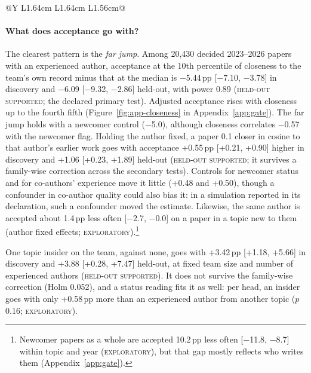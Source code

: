 \documentclass[11pt]{article}
\newcommand{\lab}[1]{\textsc{#1}}
\begin{document}
\begin{table}[t]
\begin{tabularx}{\columnwidth}{@{}Y L{1.64cm} L{1.64cm} L{1.56cm}@{}}
\bottomrule
\end{tabularx}
\caption{The gate: pp within topic and year (topic edges and keywords: against the same year's other papers). Rows
differ in population and unit: compare replication status, not size. Held-out tests are one-sided and confirm
direction, not size. $^a$Registered; predicted a penalty; MDE80 4.8. $^b$Explored against acceptance before registration. Titles:
the discovery estimate is not a test; held-out MDE80 3.2. Keywords: the discovery estimate is a declared post hoc
test on a dimension already seen. $^c$Holm across the six secondary held-out tests: topic edge 0.019, same author
0.026, insider 0.052, Emerging keywords 0.063.}
\label{tab:gate}
\end{table}

\paragraph{What does acceptance go with?}
The clearest pattern is the \emph{far jump}. Among 20,430 decided 2023--2026 papers with an experienced author,
acceptance at the 10th percentile of closeness to the team's own record minus that at the median is $-$5.44\,pp
[$-$7.10, $-$3.78] in discovery and $-$6.09 [$-$9.32, $-$2.86] held-out, with power 0.89 (\lab{held-out supported};
the declared primary test). Adjusted acceptance rises with closeness up to the fourth fifth (Figure~\ref{fig:app-closeness} in
Appendix~\ref{app:gate}).
The far jump holds with a newcomer control ($-$5.0), although closeness correlates $-$0.57 with the newcomer flag.
Holding the author fixed, a paper 0.1 closer in cosine to that author's earlier work goes with acceptance +0.55\,pp
[+0.21, +0.90] higher in discovery and +1.06 [+0.23, +1.89] held-out (\lab{held-out supported}; it survives a
family-wise correction across the secondary tests). Controls for newcomer status and for co-authors'
experience move it little (+0.48 and +0.50), though a confounder in co-author quality could also bias it: in a
simulation reported in its declaration, such a confounder moved the estimate. Likewise, the same author is accepted about 1.4\,pp less often [$-$2.7,
$-$0.0] on a paper in a topic new to them (author fixed effects; \lab{exploratory}).\footnote{Newcomer papers as a
whole are accepted 10.2\,pp less often [$-$11.8, $-$8.7] within topic and year (\lab{exploratory}), but that gap
mostly reflects who writes them (Appendix~\ref{app:gate}).}

One topic insider on the team, against none, goes with +3.42\,pp [+1.18, +5.66] in discovery and +3.88 [+0.28,
+7.47] held-out, at fixed team size and number of experienced authors (\lab{held-out supported}). It does not
survive the family-wise correction (Holm 0.052), and a status reading fits it as well: per head, an insider goes
with only +0.58\,pp more than an experienced author from another topic ($p$ 0.16; \lab{exploratory}).
\end{document}
